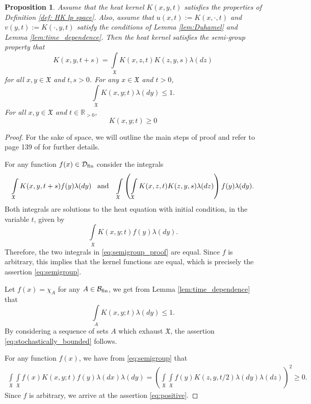 \documentclass[11pt,reqno]{amsart}
\newtheorem{proposition}[theorem]{Proposition}
\theoremstyle{remark}
\theoremstyle{definition}
\numberwithin{theorem}{section} \numberwithin{equation}{section}
\newcommand{\D}{\mathcal{D}}
\newcommand{\X}{\mathfrak{X}}
\begin{document}
\begin{proposition} \label{prop:hk_properties}
Assume that the heat kernel $K(x,y,t)$ satisfies the properties of Definition \ref{def: HK lp space}.  Also,
assume that $u(x,t):=K(x,\cdot, t)$ and $v(y,t):=K(\cdot,y,t)$ satisfy the conditions of Lemma \ref{lem:Duhamel} and
Lemma \ref{lem:time_dependence}.  Then the heat kernel satisfies the semi-group property that
\begin{equation}\label{eq:semigroup}
K(x,y,t+s) = \int\limits_{\X}K(x,z,t)K(z,y,s)\lambda(dz)
\end{equation}
for all $x,y \in \X$ and $t, s >0$.  For any $x\in\X$ and $t > 0$,
\begin{equation}\label{eq:stochastically_bounded}
\int\limits_{\X}K(x,y;t)\lambda(dy) \leq 1.
\end{equation}
For all $x,y \in \X$ and $t \in \mathbb{R}_{>0}$,
\begin{equation}\label{eq:positive}
K(x,y;t) \geq 0
\end{equation}
\end{proposition}

\begin{proof}
For the sake of space, we will outline the main steps of proof and refer to
page 139 of \cite{Ch84} for further details.

For any function $f(x)\in \D_{\rm fin}$ consider the integrals
\begin{equation}\label{eq:semigroup_proof}
\int\limits_{\X}K(x,y,t+s)f(y)\lambda(dy)
\,\,\,\,\,
\text{\rm and}
\,\,\,\,\,
\int\limits_{\X}\left(\int\limits_{\X}K(x,z,t)K(z,y,s)\lambda(dz)\right)f(y)\lambda(dy).
\end{equation}
Both integrals are solutions to the heat equation with initial condition, in the variable $t$,
given by
$$
\int\limits_{\X}K(x,y;t)f(y)\lambda(dy).
$$
Therefore, the two integrals in \eqref{eq:semigroup_proof} are equal.  Since $f$ is arbitrary, this
implies that the kernel functions are equal, which is precisely the assertion \eqref{eq:semigroup}.

Let $f(x) = \chi_{A}$ for any $A\in \mathcal{B}_{\rm fin}$, we get from Lemma \ref{lem:time_dependence}
that
$$
\int\limits_{A}K(x,y;t)\lambda(dy) \leq 1.
$$
By considering a sequence of sets $A$ which exhaust $\X$, the assertion \eqref{eq:stochastically_bounded} follows.

For any function $f(x)$, we have from \eqref{eq:semigroup} that
\begin{align*}
\int\limits_{\X}\int\limits_{\X}f(x)K(x,y;t)f(y)\lambda(dx)\lambda(dy)
=
 \left(\int\limits_{\X}\int\limits_{\X}f(y)K(z,y,t/2)\lambda(dy)\lambda(dz)\right)^{2} \geq 0.
\end{align*}
Since $f$ is arbitrary, we arrive at the assertion \eqref{eq:positive}.
\end{proof}
\end{document}
